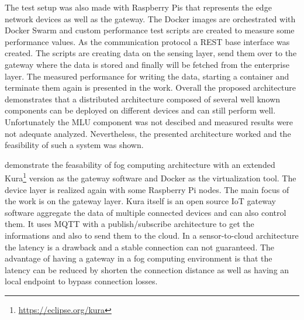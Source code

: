 The test setup was also made with Raspberry Pis that represents the edge network devices as well as the gateway.
The Docker images are orchestrated with Docker Swarm and custom performance test scripts are created to measure some performance values.
As the communication protocol a \ac{REST} base interface was created.
The scripts are creating data on the sensing layer, send them over to the gateway where the data is stored and finally will be fetched from the enterprise layer.\autocite[cf.][p. 1535]{Rufino:2017}
The measured performance for writing the data, starting a container and terminate them again is presented in the work.
Overall the proposed architecture demonstrates that a distributed architecture composed of several well known components can be deployed on different devices and can still perform well.
Unfortunately the \ac{MLU} component was not descibed and measured results were not adequate analyzed.
Nevertheless, the presented architecture worked and the feasibility of such a system was shown.

\autocite{Bellavista:2017} demonstrate the feasability of fog computing architecture with an extended Kura\footnote{\url{https://eclipse.org/kura}} version as the gateway software and Docker as the virtualization tool.
The device layer is realized again with some Raspberry Pi nodes.
The main focus of the work is on the gateway layer.
Kura itself is an open source \ac{IoT} gateway software aggregate the data of multiple connected devices and can also control them.\autocite[cf.][p. 2]{Bellavista:2017}
It uses \ac{MQTT} with a publish/subscribe architecture to get the informations and also to send them to the cloud.\autocite[cf.][p. 2]{Bellavista:2017}
In a sensor-to-cloud architecture the latency is a drawback and a stable connection can not guaranteed.\autocite[cf.][p. 1]{Bellavista:2017}
The advantage of having a gateway in a fog computing environment is that the latency can be reduced by shorten the connection distance as well as having an local endpoint to bypass connection losses.\autocite[cf.][p. 1]{Bellavista:2017}

